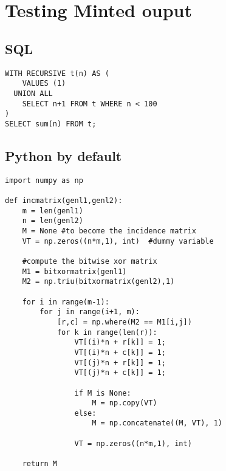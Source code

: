\hypertarget{testing-minted-ouput}{%
\section{Testing Minted ouput}\label{testing-minted-ouput}}

\hypertarget{sql}{%
\subsection{SQL}\label{sql}}

\begin{verbatim}
WITH RECURSIVE t(n) AS (
    VALUES (1)
  UNION ALL
    SELECT n+1 FROM t WHERE n < 100
)
SELECT sum(n) FROM t;
\end{verbatim}

\hypertarget{python-by-default}{%
\subsection{Python by default}\label{python-by-default}}

\begin{verbatim}
import numpy as np

def incmatrix(genl1,genl2):
    m = len(genl1)
    n = len(genl2)
    M = None #to become the incidence matrix
    VT = np.zeros((n*m,1), int)  #dummy variable

    #compute the bitwise xor matrix
    M1 = bitxormatrix(genl1)
    M2 = np.triu(bitxormatrix(genl2),1)

    for i in range(m-1):
        for j in range(i+1, m):
            [r,c] = np.where(M2 == M1[i,j])
            for k in range(len(r)):
                VT[(i)*n + r[k]] = 1;
                VT[(i)*n + c[k]] = 1;
                VT[(j)*n + r[k]] = 1;
                VT[(j)*n + c[k]] = 1;

                if M is None:
                    M = np.copy(VT)
                else:
                    M = np.concatenate((M, VT), 1)

                VT = np.zeros((n*m,1), int)

    return M
\end{verbatim}
